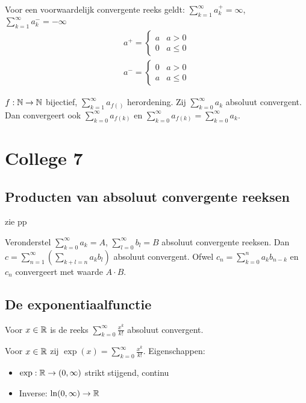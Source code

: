 \documentclass[week=1]{homework}
\begin{document}
	\Def Voor een voorwaardelijk convergente reeks geldt: $\sum_{k=1}^{\infty} a_k^+ = \infty$, $\sum_{k=1}^{\infty} a_k^- = - \infty$
	\begin{align*}
		a^+ = \begin{cases}
			a &a>0 \\
			0 &a\le 0
		\end{cases} \\
		a^- = \begin{cases}
			0 &a>0 \\
			a &a\le0
		\end{cases}
	\end{align*}
	
	\Stel[7.4.15] $f: \mathbb{N} \rightarrow \mathbb{N}$ bijectief, $\sum_{k=1}^{\infty} a_{f()}$ herordening. Zij $\sum_{k=0}^{\infty} a_k$ absoluut convergent. Dan convergeert ook $\sum_{k=0}^{\infty} a_{f(k)}$ en $\sum_{k=0}^{\infty} a_{f(k)} = \sum_{k=0}^{\infty} a_k$. 
	
	\newpage
	\section*{College 7}
	
	\subsection*{Producten van absoluut convergente reeksen}
	\Def[Cauchieproduct] zie pp
	
	\Stel Veronderstel $\sum_{k=0}^{\infty} a_k = A$, $\sum_{l=0}^{\infty} b_l = B$ absoluut convergente reeksen. Dan $c = \sum_{n=1}^{\infty} (\sum_{k+l=n} a_k b_l)$ absoluut convergent. Ofwel $c_n = \sum_{k=0}^{n} a_k b_{n-k}$ en $c_n$ convergeert met waarde $A \cdot B$.
	
	\subsection*{De exponentiaalfunctie}
	\Stel Voor $x \in \mathbb{R}$ is de reeks $\sum_{k=0}^{\infty} \frac{x^k}{k!}$ absoluut convergent. 
	
	\Def Voor $x \in \mathbb{R}$ zij $\exp(x) = \sum_{k=0}^{\infty} \frac{x^k}{k!}$. Eigenschappen:
	\begin{itemize}
		\item $\exp: \mathbb{R} \rightarrow (0, \infty)$ strikt stijgend, continu
		\item Inverse: $\ln(0,\infty) \rightarrow \mathbb{R} $
	\end{itemize}
	
\end{document}
